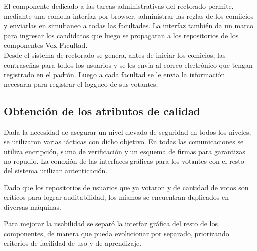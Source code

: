 El componente dedicado a las tareas administrativas del rectorado permite, mediante una comoda interfaz por browser, administrar las reglas de los comiicios y enviarlas en simultaneo a todas las facultades. La interfaz también da un marco para ingresar los candidatos que luego se propagaran a los repositorios de los componentes Vox-Facultad.
\\
Desde el sistema de rectorado se genera, antes de iniciar los comicios, las contraseñas para todos los usuarios y se les envia al correo electrónico que tengan registrado en el padrón. Luego a cada facultad se le envia la información necesaria para registrar el loggueo de sus votantes.




\subsection{Obtención de los atributos de calidad}


Dada la necesidad de asegurar un nivel elevado de seguridad en todos los niveles, se utilizaron varias tácticas con dicho objetivo. En todas las comunicaciones se utiliza encripción, suma de verificación y un esquema de firmas para garantizas no repudio. La conexión de las interfaces gráficas para los votantes con el resto del sistema utilizan autenticación.


Dado que los repositorios de usuarios que ya votaron y de cantidad de votos son críticos para lograr auditabilidad, los mismos se encuentran duplicados en diversas máquinas.

Para mejorar la usabilidad se separó la interfaz gráfica del resto de los componentes, de manera que pueda evolucionar por separado, priorizando criterios de facilidad de uso y de aprendizaje.



 
